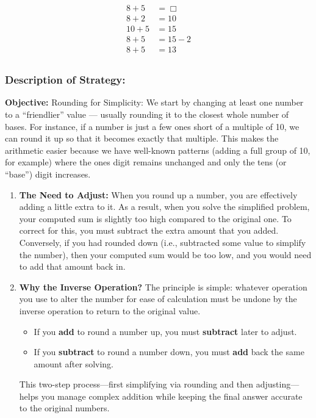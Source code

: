 \documentclass[11pt]{article}
\begin{document}
\begin{align*}
8 + 5 &= \Box \\
8+2 &= 10\\
10+5 &= 15\\
8+5 &= 15-2\\
8+5 &= 13\\
\end{align*}

\subsubsection*{Description of Strategy:}

 \textbf{Objective:} Rounding for Simplicity:
 We start by changing at least one number to a ``friendlier'' value --- usually rounding it to the closest whole number of bases. For instance, if a number is just a few ones short of a multiple of 10, we can round it up so that it becomes exactly that multiple. This makes the arithmetic easier because we have well-known patterns (adding a full group of 10, for example) where the ones digit remains unchanged and only the tens (or ``base'') digit increases.
 
 \begin{enumerate}
 \item \textbf{The Need to Adjust:} When you round up a number, you are effectively adding a little extra to it. As a result, when you solve the simplified problem, your computed sum is slightly too high compared to the original one. To correct for this, you must subtract the extra amount that you added. Conversely, if you had rounded down (i.e., subtracted some value to simplify the number), then your computed sum would be too low, and you would need to add that amount back in.
 \item \textbf{Why the Inverse Operation?} The principle is simple: whatever operation you use to alter the number for ease of calculation must be undone by the inverse operation to return to the original value.
 \begin{itemize}\item If you \textbf{add} to round a number up, you must \textbf{subtract} later to adjust.
 \item If you \textbf{subtract} to round a number down, you must \textbf{add} back the same amount after solving.
 \end{itemize}
 This two-step process—first simplifying via rounding and then adjusting—helps you manage complex addition while keeping the final answer accurate to the original numbers.
\end{enumerate}
 
\end{document}
